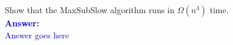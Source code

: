 \item{}
Show that the {\sc MaxSubSlow} algorithm runs in $\Omega(n^3)$ time.\\[12pt]
\ifanswers
\textcolor{blue}{
\textbf{Answer:}\\[6pt]
Answer goes here
}
\newpage
\fi
